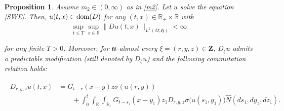 \documentclass[letterpaper, 11pt,  reqno]{amsart}
\newcommand{\wh}{\widehat}
\newtheorem{proposition}[theorem]{Proposition}
\newcommand{\noi}{\noindent}
\newcommand{\R}{\mathbb{R}}
\newcommand{\s}{\sigma}
\renewcommand{\O}{\Omega}
\newcommand{\fm}{\mathfrak{m}}
\newcommand{\fH}{\mathfrak{H}}
\newcommand{\dom}{\textup{dom}}
\numberwithin{equation}{section}
\numberwithin{theorem}{section}
\begin{document}
\begin{proposition} \label{prop:diff}
Assume $m_2\in(0,\infty)$ as in  \eqref{m2}.
Let $u$ solve the equation \eqref{SWE}. 
Then, $u(t,x)\in\dom(D)$ for any $(t,x)\in\R_+\times\R$
with
\begin{align}\label{uniD2}
 \sup_{t\leq T}\sup_{x\in\R}  \| Du(t,x) \|_{L^2(\O;\fH)}   < \infty
\end{align}

\noi
for any finite $T> 0$. 
Moreover, for $\fm$-almost every $\xi =(r, y, z)\in\mathbf{Z}$,
$D_\xi u$ admits a predictable modification
{\rm(}still denoted by $D_\xi u${\rm)}
and 
  the following  commutation relation holds:

 
\noi
\begin{align} 
\begin{aligned} \label{eq_MD}
D_{r, y, z} u(t,x) 
&= G_{t-r}(x-y)z  \s( u(r, y)) \\
&\qquad + \int_0^t \int_{\R} \int_{\R_0} G_{t-s_1}(x-y_1)  z_1 D_{r, y, z} \s\big( u(s_1, y_1) \big)   
\wh{N}(ds_1, dy_1, dz_1).
\end{aligned}
\end{align}
 



\end{proposition}

 
\end{document}
